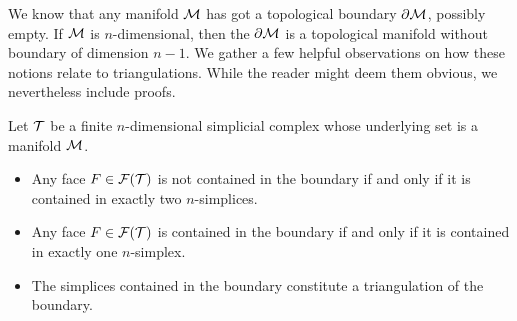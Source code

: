 \documentclass[10pt,a4paper]{article}
\begin{document}
We know that any manifold ${\mathcal M}$ has got a topological boundary $\partial{\mathcal M}$, possibly empty. 
If ${\mathcal M}$ is $n$-dimensional, then the $\partial{\mathcal M}$ is a topological manifold without boundary of dimension $n-1$. 
We gather a few helpful observations on how these notions relate to triangulations.
While the reader might deem them obvious, we nevertheless include proofs. 

\begin{lemma}\label{lemma:boundarysimplices}
    Let ${\mathcal T}$ be a finite $n$-dimensional simplicial complex whose underlying set is a manifold ${\mathcal M}$. 
    \begin{itemize}
        \item Any face $F \in {\mathcal F}({\mathcal T})$ is not contained in the boundary if and only if it is contained in exactly two $n$-simplices.
        \item Any face $F \in {\mathcal F}({\mathcal T})$ is contained in the boundary if and only if it is contained in exactly one $n$-simplex.
        \item The simplices contained in the boundary constitute a triangulation of the boundary.
    \end{itemize}
\end{lemma}
\end{document}
